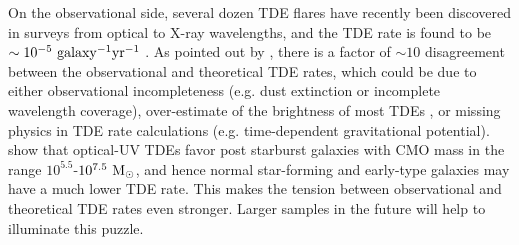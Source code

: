 \documentclass[useAMS,usenatbib]{mn2e}
\begin{document}
On the observational side, several dozen TDE flares have recently been
discovered in surveys from optical to X-ray wavelengths, and the
TDE rate is found to be $\sim10^{-5} \rm\ galaxy^{-1} yr^{-1}$
\citep{2002AJ....124.1308D, 2008ApJ...676..944G, 
    2012ApJ...749..115W, 
    2014ApJ...792...53V, 2016MNRAS.455.2918H}. As pointed out by
\citet{2016MNRAS.455..859S}, there is a 
factor of $\sim 10$ disagreement between the observational and
theoretical TDE rates, which could be due to either observational
incompleteness (e.g. dust extinction or incomplete wavelength
coverage), over-estimate of the brightness of most TDEs
\citep[e.g.][]{2015ApJ...809..166G}, or missing physics in TDE rate
calculations (e.g. time-dependent gravitational potential).
\citet{2016ApJ...818L..21F} show that optical-UV TDEs favor post 
starburst galaxies with CMO mass in the range $10^{5.5}$-$10^{7.5}\rm\
M_{\rm \odot}$, and hence normal star-forming and early-type galaxies
may have a much lower TDE rate. This makes the tension between 
observational and theoretical TDE rates even stronger. Larger samples
in the future will help to illuminate this puzzle.
\end{document}
